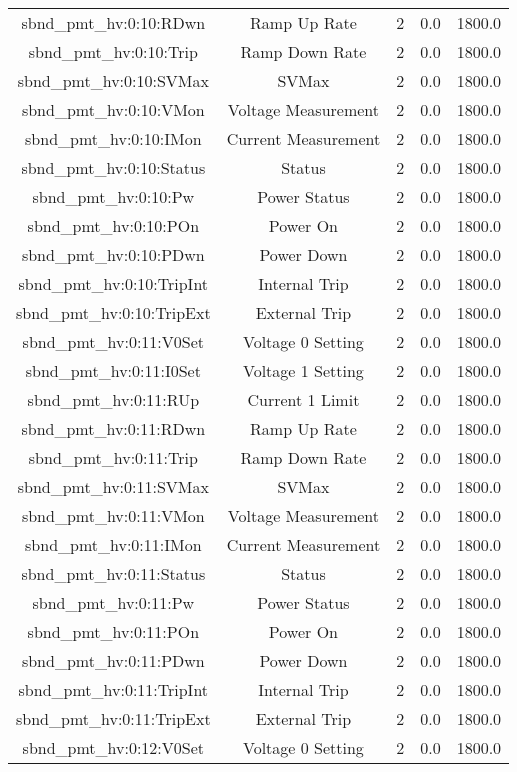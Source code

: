 \begin{table}[ptb]
\begin{tabular}{c | c c c c}
sbnd_pmt_hv:0:10:RDwn & Ramp Up Rate & 2 & 0.0 & 1800.0\\ 
sbnd_pmt_hv:0:10:Trip & Ramp Down Rate & 2 & 0.0 & 1800.0\\ 
sbnd_pmt_hv:0:10:SVMax & SVMax & 2 & 0.0 & 1800.0\\ 
sbnd_pmt_hv:0:10:VMon & Voltage Measurement & 2 & 0.0 & 1800.0\\ 
sbnd_pmt_hv:0:10:IMon & Current Measurement & 2 & 0.0 & 1800.0\\ 
sbnd_pmt_hv:0:10:Status & Status & 2 & 0.0 & 1800.0\\ 
sbnd_pmt_hv:0:10:Pw & Power Status & 2 & 0.0 & 1800.0\\ 
sbnd_pmt_hv:0:10:POn & Power On & 2 & 0.0 & 1800.0\\ 
sbnd_pmt_hv:0:10:PDwn & Power Down & 2 & 0.0 & 1800.0\\ 
sbnd_pmt_hv:0:10:TripInt & Internal Trip & 2 & 0.0 & 1800.0\\ 
sbnd_pmt_hv:0:10:TripExt & External Trip & 2 & 0.0 & 1800.0\\ 
sbnd_pmt_hv:0:11:V0Set & Voltage 0 Setting & 2 & 0.0 & 1800.0\\ 
sbnd_pmt_hv:0:11:I0Set & Voltage 1 Setting & 2 & 0.0 & 1800.0\\ 
sbnd_pmt_hv:0:11:RUp & Current 1 Limit & 2 & 0.0 & 1800.0\\ 
sbnd_pmt_hv:0:11:RDwn & Ramp Up Rate & 2 & 0.0 & 1800.0\\ 
sbnd_pmt_hv:0:11:Trip & Ramp Down Rate & 2 & 0.0 & 1800.0\\ 
sbnd_pmt_hv:0:11:SVMax & SVMax & 2 & 0.0 & 1800.0\\ 
sbnd_pmt_hv:0:11:VMon & Voltage Measurement & 2 & 0.0 & 1800.0\\ 
sbnd_pmt_hv:0:11:IMon & Current Measurement & 2 & 0.0 & 1800.0\\ 
sbnd_pmt_hv:0:11:Status & Status & 2 & 0.0 & 1800.0\\ 
sbnd_pmt_hv:0:11:Pw & Power Status & 2 & 0.0 & 1800.0\\ 
sbnd_pmt_hv:0:11:POn & Power On & 2 & 0.0 & 1800.0\\ 
sbnd_pmt_hv:0:11:PDwn & Power Down & 2 & 0.0 & 1800.0\\ 
sbnd_pmt_hv:0:11:TripInt & Internal Trip & 2 & 0.0 & 1800.0\\ 
sbnd_pmt_hv:0:11:TripExt & External Trip & 2 & 0.0 & 1800.0\\ 
sbnd_pmt_hv:0:12:V0Set & Voltage 0 Setting & 2 & 0.0 & 1800.0\\ 

\end{tabular}
\end{table}
